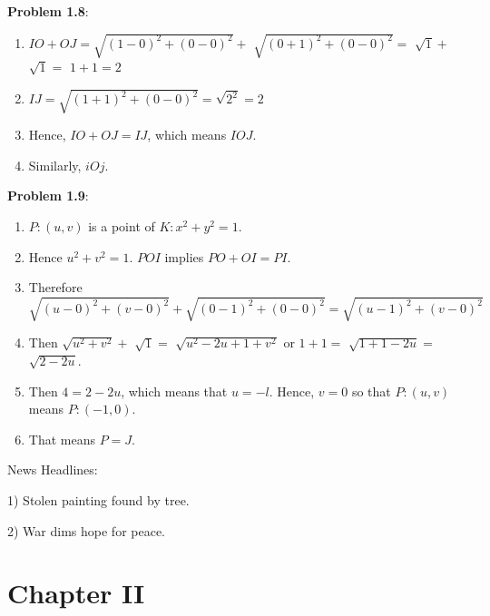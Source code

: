 \documentclass[english]{book}
\begin{document}
\textbf{Problem 1.8}:
\begin{enumerate}[\hspace{1cm}1)]
  \item $IO + OJ = \sqrt{(1 - 0)^{2} + (0 - 0)^{2}} +$ $\sqrt{(0 + 1)^{2} + (0 - 0)^{2 }} =$ $\sqrt{1} +$ $\sqrt{1} =$ $1 + 1 = 2$
  \item $IJ = \sqrt{(1+1)^{2} + (0-0)^{2}} = \sqrt{2^{2}} = 2$
  \item Hence, $IO + OJ = IJ$, which means $IOJ$.
  \item Similarly, $iOj$.
\end{enumerate}

\textbf{Problem 1.9}:
\begin{enumerate}[\hspace{1cm}1)]
  \item $P:(u,v)$ is a point of $K:x^{2} + y^{2} = 1$.
  \item Hence $u^{2} + v^{2} = 1$. $POI$ implies $PO+OI = PI$.
  \item Therefore 
    \begin{equation*}
    \sqrt{(u-0)^{2} + (v-0)^{2}} + \sqrt{(0-1)^{2}+(0-0)^{2}} = \sqrt{(u - 1)^{2}+ (v - 0)^{2}}
    \end{equation*}
  \item Then $\sqrt{u^{2}+ v^{2}} +$ $\sqrt{1} =$ $\sqrt{ u^{2}-2u + 1 + v^{2} }$ or $1+1 =$ $\sqrt{1+1-2u} =$ $\sqrt{2-2u}$.
  \item Then $4=2-2u$, which means that $u=-l$. Hence, $v=0$ so that $P:(u,v)$ means $P:(-1,0)$.
  \item That means $P=J$.
\end{enumerate}


\vspace{2cm}


\begin{center}
News Headlines:
\vspace{0.5cm}

1) Stolen painting found by tree.
\vspace{0.5cm}

2) War dims hope for peace.
\end{center}



\chapter*{Chapter II}
\end{document}
